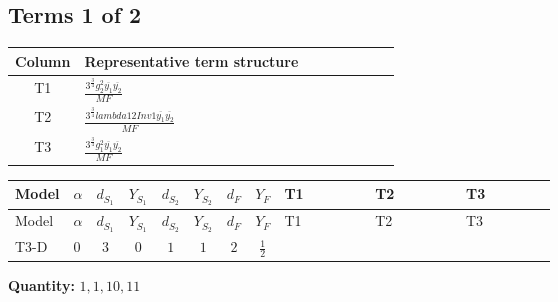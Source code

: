 \documentclass[8pt]{article}
\begin{document}
\begin{landscape}
\subsection*{Terms 1 of 2}
\begin{center}
\begin{tabular}{@{}c >{\raggedright\arraybackslash}p{0.82\linewidth}@{}}
\toprule
Column & Representative term structure \\
\midrule
T1 & \(\displaystyle \frac{3^{\frac{3}{4}} g_{2}^{2} \overline{y_{1}} \overline{y_{2}}}{MF}\) \\
\midrule
T2 & \(\displaystyle \frac{3^{\frac{3}{4}} lambda12Inv1 \overline{y_{1}} \overline{y_{2}}}{MF}\) \\
\midrule
T3 & \(\displaystyle \frac{3^{\frac{3}{4}} g_{1}^{2} \overline{y_{1}} \overline{y_{2}}}{MF}\) \\
\midrule
\bottomrule
\end{tabular}
\end{center}
\smallskip
\tiny
\begin{longtable}{@{}llcccccc >{\raggedright\arraybackslash}p{0.21\linewidth} >{\raggedright\arraybackslash}p{0.21\linewidth} >{\raggedright\arraybackslash}p{0.21\linewidth}@{}}
\toprule
Model & $\alpha$ & $d_{S_1}$ & $Y_{S_1}$ & $d_{S_2}$ & $Y_{S_2}$ & $d_F$ & $Y_F$ & T1 & T2 & T3 \\
\midrule
\endfirsthead
\toprule
Model & $\alpha$ & $d_{S_1}$ & $Y_{S_1}$ & $d_{S_2}$ & $Y_{S_2}$ & $d_F$ & $Y_F$ & T1 & T2 & T3 \\
\midrule
\endhead
T3-D & $0$ & $3$ & $0$ & $1$ & $1$ & $2$ & $\frac{1}{2}$ & \scriptsize\adjustbox{max width=\linewidth}{$\begin{gathered} - \frac{11 \cdot 3^{\frac{3}{4}} g_{2}^{2} \overline{y_{1}} \overline{y_{2}}}{8 MF}\end{gathered}$} & \scriptsize\adjustbox{max width=\linewidth}{$\begin{gathered} - \frac{3^{\frac{3}{4}} lambda12Inv1 \overline{y_{1}} \overline{y_{2}}}{6 MF}\end{gathered}$} & \scriptsize\adjustbox{max width=\linewidth}{$\begin{gathered} - \frac{3^{\frac{3}{4}} g_{1}^{2} \overline{y_{1}} \overline{y_{2}}}{8 MF}\end{gathered}$} \\
\midrule
\bottomrule
\end{longtable}
\clearpage
\noindent\textbf{Quantity: }$\mathrm{1,1,10,11}$\par\smallskip

\end{landscape}
\end{document}
